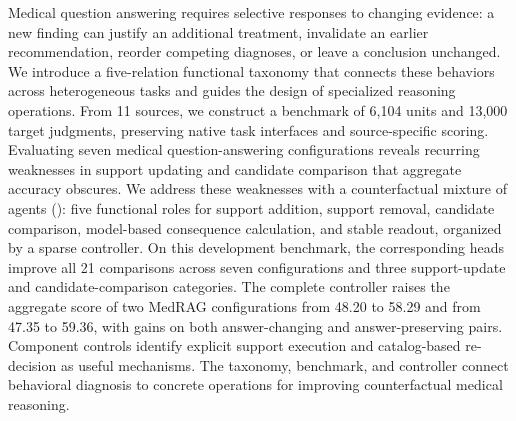 Medical question answering requires selective responses to changing evidence: a new finding can justify an additional treatment, invalidate an earlier recommendation, reorder competing diagnoses, or leave a conclusion unchanged. We introduce a five-relation functional taxonomy that connects these behaviors across heterogeneous tasks and guides the design of specialized reasoning operations. From 11 sources, we construct a benchmark of 6,104 units and 13,000 target judgments, preserving native task interfaces and source-specific scoring. Evaluating seven medical question-answering configurations reveals recurring weaknesses in support updating and candidate comparison that aggregate accuracy obscures. We address these weaknesses with a counterfactual mixture of agents (\cfmoa{}): five functional roles for support addition, support removal, candidate comparison, model-based consequence calculation, and stable readout, organized by a sparse controller. On this development benchmark, the corresponding heads improve all 21 comparisons across seven configurations and three support-update and candidate-comparison categories. The complete controller raises the aggregate score of two MedRAG configurations from 48.20 to 58.29 and from 47.35 to 59.36, with gains on both answer-changing and answer-preserving pairs. Component controls identify explicit support execution and catalog-based re-decision as useful mechanisms. The taxonomy, benchmark, and controller connect behavioral diagnosis to concrete operations for improving counterfactual medical reasoning.
